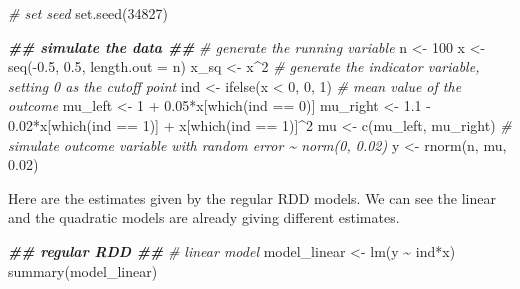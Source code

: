 \documentclass[
  11pt,
]{article}
\newenvironment{Shaded}{\begin{snugshade}}{\end{snugshade}}
\newcommand{\AttributeTok}[1]{\textcolor[rgb]{0.77,0.63,0.00}{#1}}
\newcommand{\CommentTok}[1]{\textcolor[rgb]{0.56,0.35,0.01}{\textit{#1}}}
\newcommand{\DecValTok}[1]{\textcolor[rgb]{0.00,0.00,0.81}{#1}}
\newcommand{\DocumentationTok}[1]{\textcolor[rgb]{0.56,0.35,0.01}{\textbf{\textit{#1}}}}
\newcommand{\FloatTok}[1]{\textcolor[rgb]{0.00,0.00,0.81}{#1}}
\newcommand{\FunctionTok}[1]{\textcolor[rgb]{0.00,0.00,0.00}{#1}}
\newcommand{\NormalTok}[1]{#1}
\newcommand{\OtherTok}[1]{\textcolor[rgb]{0.56,0.35,0.01}{#1}}
\newcommand{\SpecialCharTok}[1]{\textcolor[rgb]{0.00,0.00,0.00}{#1}}
\begin{document}
\begin{Shaded}
\begin{Highlighting}[]
\CommentTok{\# set seed}
\FunctionTok{set.seed}\NormalTok{(}\DecValTok{34827}\NormalTok{)}

\DocumentationTok{\#\# simulate the data \#\#}
\CommentTok{\# generate the running variable}
\NormalTok{n }\OtherTok{\textless{}{-}} \DecValTok{100}
\NormalTok{x }\OtherTok{\textless{}{-}} \FunctionTok{seq}\NormalTok{(}\SpecialCharTok{{-}}\FloatTok{0.5}\NormalTok{, }\FloatTok{0.5}\NormalTok{, }\AttributeTok{length.out =}\NormalTok{ n)}
\NormalTok{x\_sq }\OtherTok{\textless{}{-}}\NormalTok{ x}\SpecialCharTok{\^{}}\DecValTok{2}
\CommentTok{\# generate the indicator variable, setting 0 as the cutoff point}
\NormalTok{ind }\OtherTok{\textless{}{-}} \FunctionTok{ifelse}\NormalTok{(x }\SpecialCharTok{\textless{}} \DecValTok{0}\NormalTok{, }\DecValTok{0}\NormalTok{, }\DecValTok{1}\NormalTok{)}
\CommentTok{\# mean value of the outcome}
\NormalTok{mu\_left }\OtherTok{\textless{}{-}} \DecValTok{1} \SpecialCharTok{+} \FloatTok{0.05}\SpecialCharTok{*}\NormalTok{x[}\FunctionTok{which}\NormalTok{(ind }\SpecialCharTok{==} \DecValTok{0}\NormalTok{)]}
\NormalTok{mu\_right }\OtherTok{\textless{}{-}} \FloatTok{1.1} \SpecialCharTok{{-}} \FloatTok{0.02}\SpecialCharTok{*}\NormalTok{x[}\FunctionTok{which}\NormalTok{(ind }\SpecialCharTok{==} \DecValTok{1}\NormalTok{)] }\SpecialCharTok{+}\NormalTok{ x[}\FunctionTok{which}\NormalTok{(ind }\SpecialCharTok{==} \DecValTok{1}\NormalTok{)]}\SpecialCharTok{\^{}}\DecValTok{2}
\NormalTok{mu }\OtherTok{\textless{}{-}} \FunctionTok{c}\NormalTok{(mu\_left, mu\_right)}
\CommentTok{\# simulate outcome variable with random error \textasciitilde{} norm(0, 0.02)}
\NormalTok{y }\OtherTok{\textless{}{-}} \FunctionTok{rnorm}\NormalTok{(n, mu, }\FloatTok{0.02}\NormalTok{)}
\end{Highlighting}
\end{Shaded}

Here are the estimates given by the regular RDD models. We can see the
linear and the quadratic models are already giving different estimates.

\begin{Shaded}
\begin{Highlighting}[]
\DocumentationTok{\#\# regular RDD \#\#}
\CommentTok{\# linear model}
\NormalTok{model\_linear }\OtherTok{\textless{}{-}} \FunctionTok{lm}\NormalTok{(y }\SpecialCharTok{\textasciitilde{}}\NormalTok{ ind}\SpecialCharTok{*}\NormalTok{x)}
\FunctionTok{summary}\NormalTok{(model\_linear)}
\end{Highlighting}
\end{Shaded}
\end{document}
